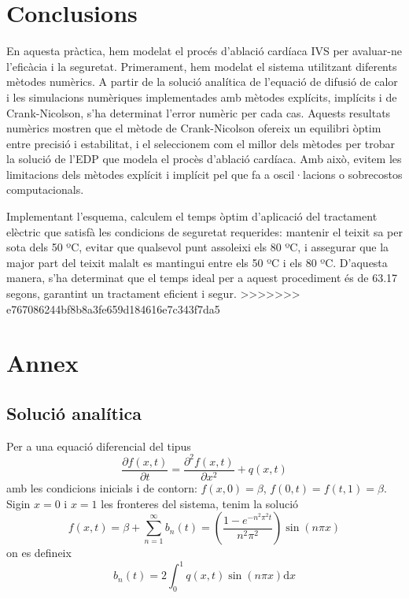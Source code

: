 \documentclass{article}
\begin{document}
\section{Conclusions}
En aquesta pràctica, hem modelat el procés d'ablació cardíaca IVS per avaluar-ne l'eficàcia i la seguretat. %
Primerament, hem modelat el sistema utilitzant diferents mètodes numèrics. A partir de la solució analítica de l'equació de difusió de calor i %
les simulacions numèriques implementades amb mètodes explícits, implícits i de Crank-Nicolson, s'ha determinat l'error numèric per cada cas. %
Aquests resultats numèrics mostren que el mètode de Crank-Nicolson ofereix un equilibri òptim entre precisió i estabilitat, i el seleccionem com el millor dels mètodes per trobar la solució de l'EDP que modela el procès d'ablació cardíaca.%
Amb això, evitem les limitacions dels mètodes explícit i implícit pel que fa a oscil·lacions o sobrecostos computacionals.

Implementant l'esquema, calculem el temps òptim d'aplicació del tractament elèctric que satisfà les condicions de seguretat requerides: %
mantenir el teixit sa per sota dels 50 ºC, evitar que qualsevol punt assoleixi els 80 ºC, i assegurar que la major %
part del teixit malalt es mantingui entre els 50 ºC i els 80 ºC. D'aquesta manera, s'ha determinat que el temps ideal per a aquest procediment és de 63.17 segons, garantint un tractament eficient i segur.
>>>>>>> e767086244bf8b8a3fe659d184616e7c343f7da5

\section{Annex}\label{Annex I}
\subsection{Solució analítica}
Per a una equació diferencial del tipus
\begin{equation*}
    \frac{\partial f(x,t)}{\partial t} = \frac{\partial^2 f(x,t)}{\partial x^2} + q(x,t)
\end{equation*}
amb les condicions inicials i de contorn: $f(x,0) = \beta$, $f(0,t)=f(t,1)= \beta$. Sigin $x=0$ i $x=1$ les fronteres del sistema, tenim la solució
\begin{equation*}
    f(x,t) = \beta +\sum_{n=1}^{\infty} b_n(t) = \left( \frac{1-e^{-n^2\pi^2t}}{n^2\pi^2}\right)\sin{(n\pi x)}
\end{equation*}
on es defineix
\begin{equation*}
    b_n(t) = 2\int_{0}^{1} q(x,t)\sin{(n\pi x)}\text{d}x
\end{equation*}
 

\end{document}

